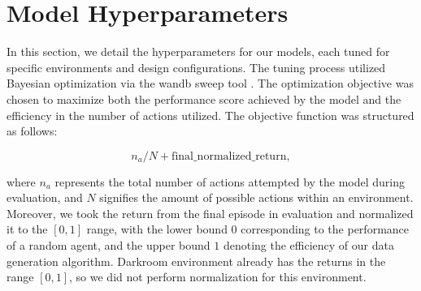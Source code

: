 \section{Model Hyperparameters}
\label{appendix:hypers}
In this section, we detail the hyperparameters for our models, each tuned for specific environments and design configurations. The tuning process utilized Bayesian optimization via the wandb sweep tool \citep{wandb}. The optimization objective was chosen to maximize both the performance score achieved by the model and the efficiency in the number of actions utilized. The objective function was structured as follows:

\[
n_a/N + \text{final\_normalized\_return},
\]

where $n_a$ represents the total number of actions attempted by the model during evaluation, and $N$ signifies the amount of possible actions within an environment. Moreover, we took the return from the final episode in evaluation and normalized it to the $[0,1]$ range, with the lower bound $0$ corresponding to the performance of a random agent, and the upper bound $1$ denoting the efficiency of our data generation algorithm. Darkroom environment already has the returns in the range $[0,1]$, so we did not perform normalization for this environment.


